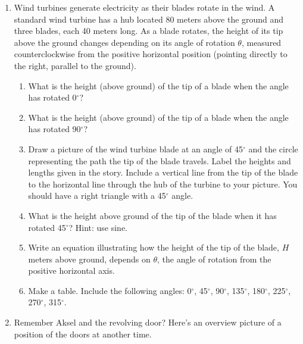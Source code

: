 \begin{enumerate}
\item Wind turbines generate electricity as their blades rotate in the wind. A standard wind turbine has a hub located 80 meters above the ground and three blades, each 40 meters long. As a blade rotates, the height of its tip above the ground changes depending on its angle of rotation $\theta$, measured counterclockwise from the positive horizontal position (pointing directly to the right, parallel to the ground).
\begin{enumerate}
    \item What is the height (above ground) of the tip of a blade when the angle has rotated 0$^\circ$?
    \item What is the height (above ground) of the tip of a blade when the angle has rotated 90$^\circ$?
    \item Draw a picture of the wind turbine blade at an angle of 45$^\circ$ and the circle representing the path the tip of the blade travels.  Label the heights and lengths given in the story. Include a vertical line from the tip of the blade to the horizontal line through the hub of the turbine to your picture.  You should have a right triangle with a 45$^\circ$ angle.
    \item What is the height above ground of the tip of the blade when it has rotated 45$^\circ$? Hint: use sine.
    \item Write an equation illustrating how the height of the tip of the blade, $H$ meters above ground, depends on $\theta$, the angle of rotation from the positive horizontal axis.
    \item Make a table. Include the following angles: 0$^\circ$, 45$^\circ$, 90$^\circ$, 135$^\circ$, 180$^\circ$, 225$^\circ$, 270$^\circ$, 315$^\circ$.
\end{enumerate}  %

\item Remember Aksel and the revolving door?  Here's an overview picture of a position of the doors at another time.

\begin{center}
\end{center}
\end{enumerate}

